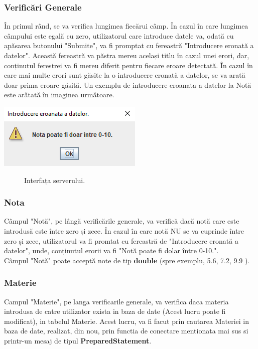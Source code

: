 \documentclass{article}
\begin{document}
		\subsubsection*{Verificări Generale}
		În primul rând, se va verifica lungimea fiecărui câmp. În cazul în care lungimea câmpului este egală cu zero, utilizatorul care introduce datele va, odată cu apăsarea butonului "Submite", va fi promptat cu fereastră "Introducere eronată a datelor". Această fereastră va păstra mereu același titlu în cazul unei erori, dar, conținutul ferestrei va fi mereu diferit pentru fiecare eroare detectată. În cazul în care mai multe erori sunt găsite la o introducere eronată a datelor, se va arată doar prima eroare găsită. Un exemplu de introducere eroanata a datelor la Notă este arătată în imaginea următoare.
	
	\begin{center}
		\includegraphics[scale=1]{Source/ServerNotaEroare}
		\begin{figure}[!h]
			{\caption*{Interfața serverului.}}
		\end{figure}
	\end{center}

		\subsubsection*{Nota}

	Câmpul "Notă", pe lângă verificările generale, va verifică dacă notă care este introdusă este între zero și zece. În cazul în care notă NU se va cuprinde între zero și zece, utilizatorul va fi promtat cu fereastră de "Introducere eronată a datelor", unde, conținutul erorii va fi "Notă poate fi dolar între 0-10.".\\
	Câmpul "Notă" poate acceptă note de tip \textbf{double} (spre exemplu, 5.6, 7.2, 9.9 ).

		\subsubsection*{Materie}

	Campul "Materie", pe langa verificarile generale, va verifica daca materia introdusa de catre utilizator exista in baza de date (Acest lucru poate fi modificat), in tabelul Materie. Acest lucru, va fi facut prin cautarea Materiei in baza de date, realizat, din nou, prin functia de conectare mentionata mai sus si printr-un mesaj de tipul \textbf{PreparedStatement}.
\end{document}
